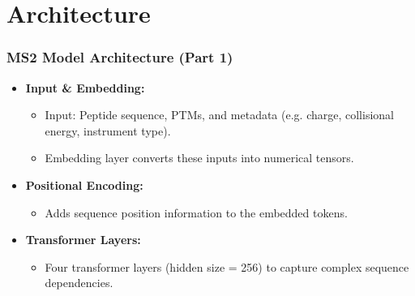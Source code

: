 \documentclass{beamer}
\begin{document}
\section{Architecture}
\begin{frame}
  \frametitle{MS2 Model Architecture (Part 1)}
  \begin{itemize}
    \item \textbf{Input \& Embedding:}
      \begin{itemize}
        \item Input: Peptide sequence, PTMs, and metadata (e.g. charge, collisional energy, instrument type).
        \item Embedding layer converts these inputs into numerical tensors.
      \end{itemize}
    \item \textbf{Positional Encoding:}
      \begin{itemize}
        \item Adds sequence position information to the embedded tokens.
      \end{itemize}
    \item \textbf{Transformer Layers:}
      \begin{itemize}
        \item Four transformer layers (hidden size = 256) to capture complex sequence dependencies.
      \end{itemize}
  \end{itemize}
\end{frame}
\end{document}
